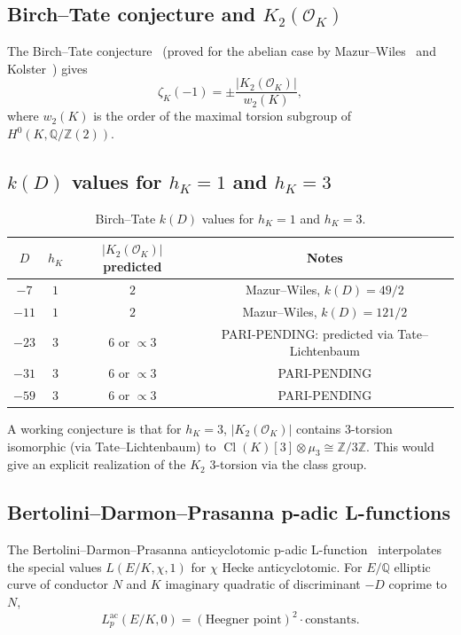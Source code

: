 \documentclass[11pt,a4paper]{amsart}
\theoremstyle{definition}
\DeclareMathOperator{\Cl}{Cl}
\newcommand{\Q}{\mathbb{Q}}
\newcommand{\Z}{\mathbb{Z}}
\newcommand{\OK}{\mathcal{O}_K}
\newcommand{\hK}{h_{K}}
\begin{document}
\subsection{Birch--Tate conjecture and $K_2(\OK)$}\label{sec:birch-tate}

The Birch--Tate conjecture~\cite{BirchTate1973} (proved for the abelian case by Mazur--Wiles~\cite{MazurWiles1984} and Kolster~\cite{Kolster1989}) gives
\begin{equation}\label{eq:birch-tate-v4}
\zeta_K(-1) = \pm \frac{|K_2(\OK)|}{w_2(K)},
\end{equation}
where $w_2(K)$ is the order of the maximal torsion subgroup of $H^0(K, \Q/\Z(2))$.

\subsection{$k(D)$ values for $\hK = 1$ and $\hK = 3$}\label{sec:kD-v4}

\begin{table}[h]
\centering
\caption{Birch--Tate $k(D)$ values for $\hK = 1$ and $\hK = 3$.}
\label{tab:kD-values-v4}
\begin{tabular}{cccc}
\toprule
$D$ & $\hK$ & $|K_2(\OK)|$ predicted & Notes \\
\midrule
$-7$ & $1$ & $2$ & Mazur--Wiles, $k(D) = 49/2$ \\
$-11$ & $1$ & $2$ & Mazur--Wiles, $k(D) = 121/2$ \\
$-23$ & $3$ & $6$ or $\propto 3$ & PARI-PENDING: predicted via Tate--Lichtenbaum \\
$-31$ & $3$ & $6$ or $\propto 3$ & PARI-PENDING \\
$-59$ & $3$ & $6$ or $\propto 3$ & PARI-PENDING \\
\bottomrule
\end{tabular}
\end{table}

A working conjecture is that for $\hK = 3$, $|K_2(\OK)|$ contains 3-torsion isomorphic (via Tate--Lichtenbaum) to $\Cl(K)[3] \otimes \mu_3 \cong \Z/3\Z$. This would give an explicit realization of the $K_2$ 3-torsion via the class group.

\subsection{Bertolini--Darmon--Prasanna p-adic L-functions}\label{sec:BDP-bridge}

The Bertolini--Darmon--Prasanna anticyclotomic p-adic L-function~\cite{BDP2013} interpolates the special values $L(E/K, \chi, 1)$ for $\chi$ Hecke anticyclotomic. For $E/\Q$ elliptic curve of conductor $N$ and $K$ imaginary quadratic of discriminant $-D$ coprime to $N$,
\[
L_p^{\mathrm{ac}}(E/K, 0) = (\text{Heegner point})^2 \cdot \text{constants}.
\]
\end{document}
